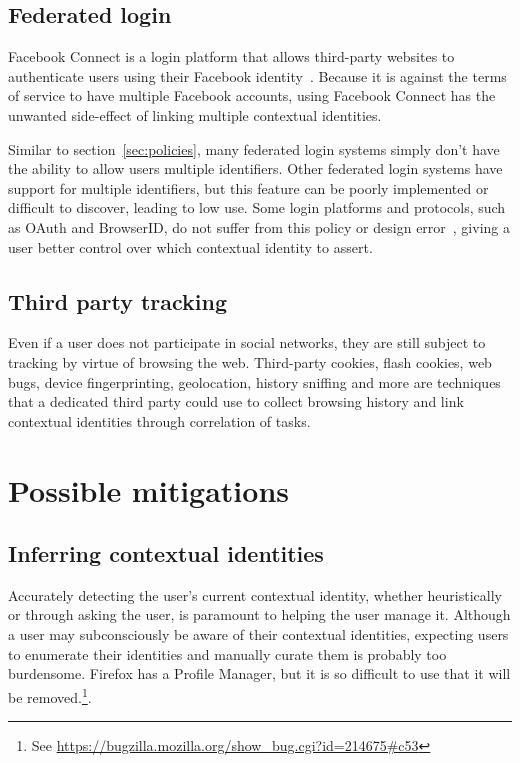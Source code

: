 \documentclass[10pt, conference, compsocconf]{IEEEtran}
\begin{document}
\subsection{Federated login}
\label{sec:login}
Facebook Connect is a login platform that allows third-party websites to
authenticate users using their Facebook identity~\cite{fb_connect}. Because it
is against the terms of service to have multiple Facebook accounts, using
Facebook Connect has the unwanted side-effect of linking multiple contextual
identities.

Similar to section~\ref{sec:policies}, many federated login systems simply
don't have the ability to allow users multiple identifiers.
Other federated login systems have support for multiple identifiers, but
this feature can be poorly implemented or difficult to discover, leading to
low use.
Some login platforms and protocols, such as OAuth and BrowserID,
do not suffer from this policy or design error~\cite{browserid,oauth},
giving a user better control over which contextual identity to assert.

\subsection{Third party tracking}
\label{sec:tracking}
Even if a user does not participate in social networks, they are still subject
to tracking by virtue of browsing the web. Third-party cookies, flash cookies,
web bugs, device fingerprinting, geolocation, history sniffing and more are
techniques that a dedicated third party could use to collect browsing history
and link contextual identities through correlation of tasks.

\section{Possible mitigations}

\subsection{Inferring contextual identities}
Accurately detecting the user's current contextual identity, whether
heuristically or through asking the user, is paramount to helping the user
manage it.
Although a user may subconsciously be aware of their contextual identities,
expecting users to enumerate their identities and manually curate them is
probably too burdensome. Firefox has a Profile Manager, but it is so difficult to use that it will be removed.\footnote{See \url{https://bugzilla.mozilla.org/show\_bug.cgi?id=214675\#c53}}.
\end{document}
